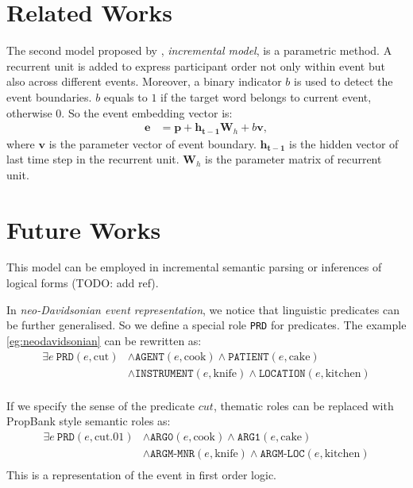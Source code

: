\documentclass[a4paper]{article}
\begin{document}
\section{Related Works}
The second model proposed by \citet{tilk2016event}, \textit{incremental model}, is a parametric method. A recurrent unit is added to express participant order not only within event but also across different events. Moreover, a binary indicator $b$ is used to detect the event boundaries. $b$ equals to $1$ if the target word belongs to current event, otherwise $0$. So the event embedding vector is: 
\begin{equation} \label{eq:incremental}
\begin{aligned}
    \mathbf{e} 
        &= \mathbf{p} + \mathbf{h_{t-1}}\mathbf{W}_h + b\mathbf{v}, 
\end{aligned}
\end{equation}
where $\mathbf{v}$ is the parameter vector of event boundary. $\mathbf{h_{t-1}}$ is the hidden vector of last time step in the recurrent unit. $\mathbf{W}_h$ is the parameter matrix of recurrent unit. 


\section{Future Works}
This model can be employed in incremental semantic parsing \citep{konstas2014incremental, konstas2015semantic} or inferences of logical forms (TODO: add ref). 

In \textit{neo-Davidsonian event representation}, we notice that linguistic predicates can be further generalised. So we define a special role \texttt{PRD} for predicates. The example \ref{eg:neodavidsonian} can be rewritten as: 
\begin{equation*} \label{eg:symbolic-thematic}
\begin{aligned}
    \exists e\ \texttt{PRD}(e, \text{cut})
    & \land \texttt{AGENT}(e, \text{cook}) \land \texttt{PATIENT}(e, \text{cake}) \\
    & \land \texttt{INSTRUMENT}(e, \text{knife}) \land \texttt{LOCATION}(e, \text{kitchen}) \\
\end{aligned}
\end{equation*}

If we specify the sense of the predicate $cut$, thematic roles can be replaced with PropBank style semantic roles as: 
\begin{equation*} \label{eg:symbolic-semantic}
\begin{aligned}
    \exists e\ \texttt{PRD}(e, \text{cut.01})
    & \land \texttt{ARG0}(e, \text{cook}) \land \texttt{ARG1}(e, \text{cake}) \\
    & \land \texttt{ARGM-MNR}(e, \text{knife}) \land \texttt{ARGM-LOC}(e, \text{kitchen}) \\
\end{aligned}
\end{equation*}
This is a representation of the event in first order logic. 
\end{document}
